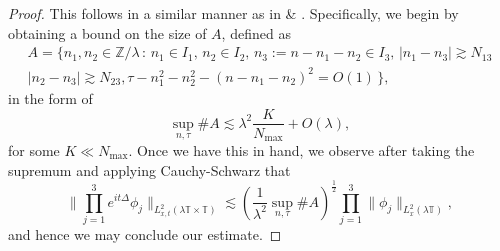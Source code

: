 \documentclass[12pt, letterpaper]{amsart}
\begin{document}
\begin{proof}
    This follows in a similar manner as in \cite{de2007global} \& \cite{li2011global}. Specifically, we begin by obtaining a bound on the size of $A$, defined as 
    \begin{multline*}
        A = \{n_1,n_2\in\mathbb{Z}/\lambda\,:\,n_1\in I_1,\,n_2\in I_2,\,n_3:=n-n_1-n_2\in I_3,\,|n_1-n_3|\gtrsim N_{13}\\
        |n_2-n_3|\gtrsim N_{23}, \tau-n_1^2-n_2^2-(n-n_1-n_2)^2 = O(1)\,\},
    \end{multline*}
    in the form of
    \[
    \sup_{n,\tau}\#A\lesssim \lambda^2\frac{K}{N_{\max}}+O(\lambda),
    \]
    for some $K\ll N_{\max}$. Once we have this in hand, we observe after taking the supremum and applying Cauchy-Schwarz that
    \[
\|\prod_{j=1}^3e^{it\Delta}\phi_j\|_{L^2_{x,t}(\lambda\mathbb{T}\times\mathbb{T})}\lesssim \left(\frac{1}{\lambda^2}\sup_{n,\tau}\#A\right)^\frac12\prod_{j=1}^3\|\phi_j\|_{L^2_x(\lambda\mathbb{T})},
    \]
    and hence we may conclude our estimate.


\end{proof}
\end{document}

